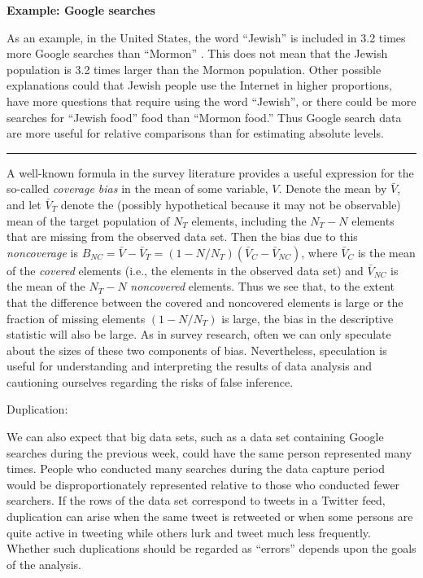 \documentclass[]{krantz}
\begin{document}
\textbf{Example: Google searches}

As an example, in the United States, the word ``Jewish'' is included in
3.2 times more Google searches than ``Mormon'' \citep{SDV2015}. This
does not mean that the Jewish population is 3.2 times larger than the
Mormon population. Other possible explanations could that Jewish people
use the Internet in higher proportions, have more questions that require
using the word ``Jewish'', or there could be more searches for ``Jewish
food'' food than ``Mormon food.'' Thus Google search data are more
useful for relative comparisons than for estimating absolute levels.

\begin{center}\rule{0.5\linewidth}{\linethickness}\end{center}

A well-known formula in the survey literature provides a useful
expression for the so-called \emph{coverage bias} in the mean of some
variable, \(V\). Denote the mean by \(\bar{V}\), and let \(\bar{V}_T\)
denote the (possibly hypothetical because it may not be observable) mean
of the target population of \(N_{T}\) elements, including the
\(N_{T}-N\) elements that are missing from the observed data set. Then
the bias due to this \emph{noncoverage} is
\(B_{NC} = \bar{V} - \bar{V}_T = (1 - N / N_T )(\bar{V}_C - \bar{V}_{NC})\),
where \(\bar{V}_C\) is the mean of the \emph{covered} elements (i.e.,
the elements in the observed data set) and \(\bar{V}_{NC}\) is the mean
of the \(N_{T}-N\) \emph{noncovered} elements. Thus we see that, to the
extent that the difference between the covered and noncovered elements
is large or the fraction of missing elements \((1 - N / N_T)\) is large,
the bias in the descriptive statistic will also be large. As in survey
research, often we can only speculate about the sizes of these two
components of bias. Nevertheless, speculation is useful for
understanding and interpreting the results of data analysis and
cautioning ourselves regarding the risks of false inference.

Duplication:

We can also expect that big data sets, such as a data set containing
Google searches during the previous week, could have the same person
represented many times. People who conducted many searches during the
data capture period would be disproportionately represented relative to
those who conducted fewer searchers. If the rows of the data set
correspond to tweets in a Twitter feed, duplication can arise when the
same tweet is retweeted or when some persons are quite active in
tweeting while others lurk and tweet much less frequently. Whether such
duplications should be regarded as ``errors'' depends upon the goals of
the analysis.
\end{document}

